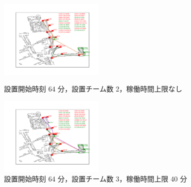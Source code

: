 \documentclass[a4paper,12pt,fleqn]{jarticle}
\begin{document}
\begin{figure}
 \begin{center}
  \begin{minipage}{0.49\hsize}
   \begin{center}
    \includegraphics[width=5cm,trim=100 50 100 50]{fig/64min_2team_nolim.pdf}
    \caption{設置開始時刻 64 分，\newline \quad 設置チーム数 2，稼働時間上限なし}
    \label{fig:64min_2team_nolim}
   \end{center}
  \end{minipage}
  \begin{minipage}{0.49\hsize}
   \begin{center}
    \includegraphics[width=5cm,trim=100 50 100 50]{fig/64min_3team_lim40min.pdf}
    \caption{設置開始時刻 64 分，\newline \quad 設置チーム数 3，稼働時間上限 40 分}
    \label{fig:64min_3team_lim40min}
   \end{center}
  \end{minipage}
 \end{center}
\end{figure}
\end{document}
